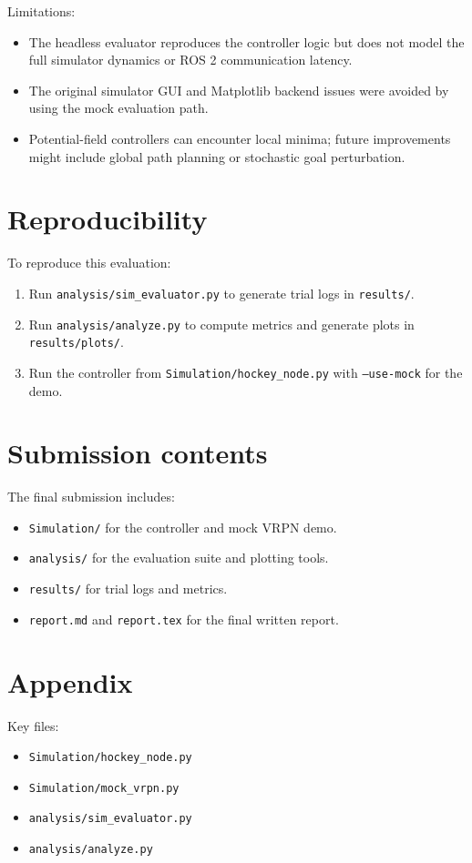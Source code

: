 \documentclass[11pt,a4paper]{article}
\begin{document}
Limitations:
\begin{itemize}
  \item The headless evaluator reproduces the controller logic but does not model the full simulator dynamics or ROS 2 communication latency.
  \item The original simulator GUI and Matplotlib backend issues were avoided by using the mock evaluation path.
  \item Potential-field controllers can encounter local minima; future improvements might include global path planning or stochastic goal perturbation.
\end{itemize}

\section{Reproducibility}
To reproduce this evaluation:
\begin{enumerate}
  \item Run \texttt{analysis/sim_evaluator.py} to generate trial logs in \texttt{results/}.
  \item Run \texttt{analysis/analyze.py} to compute metrics and generate plots in \texttt{results/plots/}.
  \item Run the controller from \texttt{Simulation/hockey_node.py} with \texttt{--use-mock} for the demo.
\end{enumerate}

\section{Submission contents}
The final submission includes:
\begin{itemize}
  \item \texttt{Simulation/} for the controller and mock VRPN demo.
  \item \texttt{analysis/} for the evaluation suite and plotting tools.
  \item \texttt{results/} for trial logs and metrics.
  \item \texttt{report.md} and \texttt{report.tex} for the final written report.
\end{itemize}

\section{Appendix}
Key files:
\begin{itemize}
  \item \texttt{Simulation/hockey_node.py}
  \item \texttt{Simulation/mock_vrpn.py}
  \item \texttt{analysis/sim_evaluator.py}
  \item \texttt{analysis/analyze.py}
\end{itemize}
\end{document}
